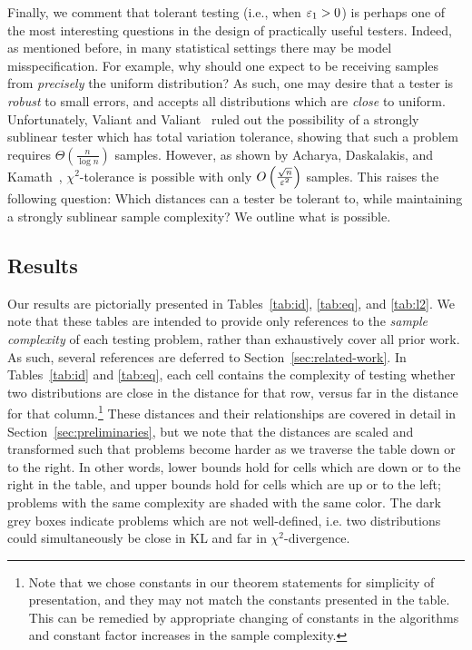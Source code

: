 Finally, we comment that tolerant testing (i.e., when $\varepsilon_1 > 0$) is perhaps one of the most interesting questions in the design of practically useful testers.
Indeed, as mentioned before, in many statistical settings there may be model misspecification.
For example, why should one expect to be receiving samples from \emph{precisely} the uniform distribution?
As such, one may desire that a tester is \emph{robust} to small errors, and accepts all distributions which are \emph{close} to uniform.
Unfortunately, Valiant and Valiant~\cite{ValiantV11a} ruled out the possibility of a strongly sublinear tester which has total variation tolerance, showing that such a problem requires $\Theta\left(\frac{n}{\log n}\right)$ samples.
However, as shown by Acharya, Daskalakis, and Kamath~\cite{AcharyaDK15}, $\chi^2$-tolerance is possible with only $O\left(\frac{\sqrt{n}}{\varepsilon^2}\right)$ samples.
This raises the following question: Which distances can a tester be tolerant to, while maintaining a strongly sublinear sample complexity? We outline what is possible.

\subsection{Results} \label{sec:results}
Our results are pictorially presented in Tables~\ref{tab:id}, \ref{tab:eq}, and \ref{tab:l2}.
We note that these tables are intended to provide only references to the \emph{sample complexity} of each testing problem, rather than exhaustively cover all prior work. 
As such, several references are deferred to Section~\ref{sec:related-work}.
In Tables~\ref{tab:id} and \ref{tab:eq}, each cell contains the complexity of testing whether two distributions are close in the distance for that row, versus far in the distance for that column.\footnote{Note that we chose constants in our theorem statements for simplicity of presentation, and they may not match the constants presented in the table. This can be remedied by appropriate changing of constants in the algorithms and constant factor increases in the sample complexity.}
These distances and their relationships are covered in detail in Section~\ref{sec:preliminaries}, but we note that the distances are scaled and transformed such that problems become harder as we traverse the table down or to the right.
In other words, lower bounds hold for cells which are down or to the right in the table, and upper bounds hold for cells which are up or to the left; problems with the same complexity are shaded with the same color.
The dark grey boxes indicate problems which are not well-defined, i.e. two distributions could simultaneously be close in KL and far in $\chi^2$-divergence.





